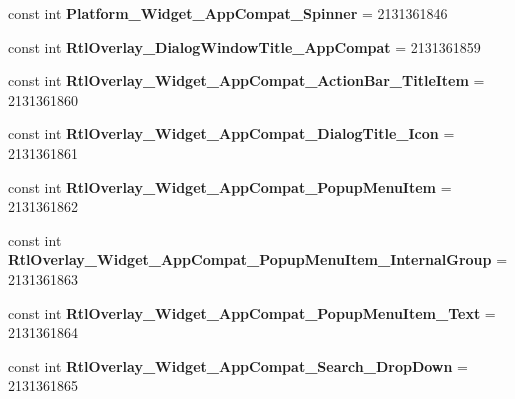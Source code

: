 \begin{DoxyCompactItemize}
\mbox{\label{classXaria_1_1Resource_1_1Style_a939dd1f86be850c074c13056b7c967c4}} 
const int {\bfseries Platform\+\_\+\+Widget\+\_\+\+App\+Compat\+\_\+\+Spinner} = 2131361846
\item 
\mbox{\label{classXaria_1_1Resource_1_1Style_ada3cba34a6fd3ca11fe98e36c1314407}} 
const int {\bfseries Rtl\+Overlay\+\_\+\+Dialog\+Window\+Title\+\_\+\+App\+Compat} = 2131361859
\item 
\mbox{\label{classXaria_1_1Resource_1_1Style_ac66edb1ae3b81fb8bc0d92e5cac08264}} 
const int {\bfseries Rtl\+Overlay\+\_\+\+Widget\+\_\+\+App\+Compat\+\_\+\+Action\+Bar\+\_\+\+Title\+Item} = 2131361860
\item 
\mbox{\label{classXaria_1_1Resource_1_1Style_a574373016c70de9e47272690b99654c8}} 
const int {\bfseries Rtl\+Overlay\+\_\+\+Widget\+\_\+\+App\+Compat\+\_\+\+Dialog\+Title\+\_\+\+Icon} = 2131361861
\item 
\mbox{\label{classXaria_1_1Resource_1_1Style_adf438b5ebbd2b073f2d36c225ed59393}} 
const int {\bfseries Rtl\+Overlay\+\_\+\+Widget\+\_\+\+App\+Compat\+\_\+\+Popup\+Menu\+Item} = 2131361862
\item 
\mbox{\label{classXaria_1_1Resource_1_1Style_a900397c14c662657a4c28805fcbe0021}} 
const int {\bfseries Rtl\+Overlay\+\_\+\+Widget\+\_\+\+App\+Compat\+\_\+\+Popup\+Menu\+Item\+\_\+\+Internal\+Group} = 2131361863
\item 
\mbox{\label{classXaria_1_1Resource_1_1Style_a7f86b6b2644caed29fec5157ff996314}} 
const int {\bfseries Rtl\+Overlay\+\_\+\+Widget\+\_\+\+App\+Compat\+\_\+\+Popup\+Menu\+Item\+\_\+\+Text} = 2131361864
\item 
\mbox{\label{classXaria_1_1Resource_1_1Style_ae39a71736d203fb5b1f93e33721edd28}} 
const int {\bfseries Rtl\+Overlay\+\_\+\+Widget\+\_\+\+App\+Compat\+\_\+\+Search\+\_\+\+Drop\+Down} = 2131361865
\item 
\mbox{\label{classXaria_1_1Resource_1_1Style_a8ae1433c269728ac9d6259ffa80c3279}} 

\end{DoxyCompactItemize}
